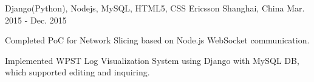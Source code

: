 \begin{cventries}

\cventry
{Django(Python), Nodejs, MySQL, HTML5, CSS} %
{Ericsson} %
{Shanghai, China} %
{Mar. 2015 - Dec. 2015} %
{ %
\begin{cvitems}
\item {Completed PoC for Network Slicing based on Node.js WebSocket communication.}
\item {Implemented WPST Log Visualization System using Django with MySQL DB, which supported editing and inquiring.}
\end{cvitems}
}


\end{cventries}
